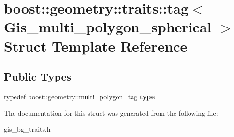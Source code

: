 \hypertarget{structboost_1_1geometry_1_1traits_1_1tag_3_01Gis__multi__polygon__spherical_01_4}{}\section{boost\+:\+:geometry\+:\+:traits\+:\+:tag$<$ Gis\+\_\+multi\+\_\+polygon\+\_\+spherical $>$ Struct Template Reference}
\label{structboost_1_1geometry_1_1traits_1_1tag_3_01Gis__multi__polygon__spherical_01_4}
\subsection*{Public Types}
\begin{DoxyCompactItemize}
\item 
\mbox{\label{structboost_1_1geometry_1_1traits_1_1tag_3_01Gis__multi__polygon__spherical_01_4_a5e8697f9ac7cf62565a97edd96d64185}} 
typedef boost\+::geometry\+::multi\+\_\+polygon\+\_\+tag {\bfseries type}
\end{DoxyCompactItemize}


The documentation for this struct was generated from the following file\+:\begin{DoxyCompactItemize}
\item 
gis\+\_\+bg\+\_\+traits.\+h\end{DoxyCompactItemize}
